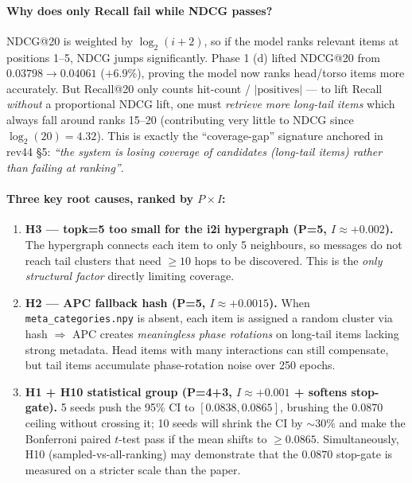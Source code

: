 \documentclass[11pt,a4paper]{article}
\begin{document}
\paragraph{Why does only Recall fail while NDCG passes?}
NDCG@20 is weighted by $\log_2(i+2)$, so if the model ranks relevant items at
positions 1--5, NDCG jumps significantly. Phase 1 (d) lifted NDCG@20 from
$0.03798 \to 0.04061$ ($+6.9\%$), proving the model now ranks head/torso
items more accurately. But Recall@20 only counts hit-count / $|\text{positives}|$
--- to lift Recall \emph{without} a proportional NDCG lift, one must
\emph{retrieve more long-tail items} which always fall around ranks 15--20
(contributing very little to NDCG since $\log_2(20)=4.32$). This is exactly
the ``coverage-gap'' signature anchored in rev44 \S5:
\emph{``the system is losing coverage of candidates (long-tail items) rather
than failing at ranking''}.

\paragraph{Three key root causes, ranked by $P\times I$:}
\begin{enumerate}[leftmargin=*]
    \item \textbf{H3 --- topk=5 too small for the i2i hypergraph (P=5, $I\approx+0.002$).}
    The hypergraph connects each item to only 5 neighbours, so messages do not
    reach tail clusters that need $\geq 10$ hops to be discovered. This is the
    \emph{only structural factor} directly limiting coverage.

    \item \textbf{H2 --- APC fallback hash (P=5, $I\approx+0.0015$).}
    When \texttt{meta\_categories.npy} is absent, each item is assigned a random
    cluster via hash $\Rightarrow$ APC creates \emph{meaningless phase rotations}
    on long-tail items lacking strong metadata. Head items with many
    interactions can still compensate, but tail items accumulate phase-rotation
    noise over 250 epochs.

    \item \textbf{H1 + H10 statistical group (P=4+3, $I\approx+0.001$ + softens stop-gate).}
    5 seeds push the 95\% CI to $[0.0838, 0.0865]$, brushing the $0.0870$ ceiling
    without crossing it; 10 seeds will shrink the CI by $\sim 30\%$ and make the
    Bonferroni paired $t$-test pass if the mean shifts to $\geq 0.0865$.
    Simultaneously, H10 (sampled-vs-all-ranking) may demonstrate that the
    $0.0870$ stop-gate is measured on a stricter scale than the paper.
\end{enumerate}
\end{document}
